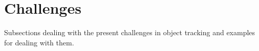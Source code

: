 \section{Challenges}

Subsections dealing with the present challenges in object tracking and examples for
dealing with them.

